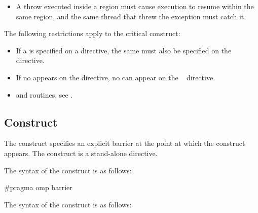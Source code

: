 \cppspecificstart
\begin{itemize}
\item A throw executed inside a  region must cause execution to resume within 
the same  region, and the same thread that threw the exception must catch 
it.
\end{itemize}
\cppspecificend

\fortranspecificstart
The following restrictions apply to the critical construct:

\begin{itemize}
\item If a  is specified on a  directive, the same  must also be 
specified on the ~ directive. 

\item If no  appears on the  directive, no  can appear on the 
~ directive.
\end{itemize}
\fortranspecificend

\crossreferences
\begin{itemize}
\item {} and  routines, see .
\end{itemize}









\subsection{ Construct}
\label{subsec:barrier Construct}
\summary
The  construct specifies an explicit barrier at the point at which the construct 
appears. The  construct is a stand-alone directive.

\syntax
\ccppspecificstart
The syntax of the  construct is as follows:

\begin{boxedcode}
\#pragma omp barrier 
\end{boxedcode}
\ccppspecificend

\fortranspecificstart
The syntax of the  construct is as follows:

